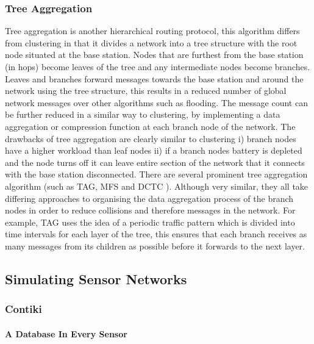 \subsubsection*{Tree Aggregation}
Tree aggregation is another hierarchical routing protocol, this algorithm differs from clustering in that it divides a network into a tree structure with the root node situated at the base station. Nodes that are furthest from the base station (in hops) become leaves of the tree and any intermediate nodes become branches. Leaves and branches forward messages towards the base station and around the network using the tree structure, this results in a reduced number of global network messages over other algorithms such as flooding. The message count can be further reduced in a similar way to clustering, by implementing a data aggregation or compression function at each branch node of the network. The drawbacks of tree aggregation are clearly similar to clustering i) branch nodes have a higher workload than leaf nodes ii) if a branch nodes battery is depleted and the node turns off it can leave entire section of the network that it connects with the base station disconnected. There are several prominent tree aggregation algorithm (such as TAG, MFS and DCTC \cite{1628365}). Although very similar, they all take differing approaches to organising the data aggregation process of the branch nodes in order to reduce collisions and therefore messages in the network. For example, TAG uses the idea of a periodic traffic pattern which is divided into time intervals for each layer of the tree, this ensures that each branch receives as many messages from its children as possible before it forwards to the next layer.   


\cite{aggphdfeng} %
\cite{TankBible} %
\cite{Akkaya2005325} %

\subsection{Simulating Sensor Networks}

\subsubsection*{Contiki}

\paragraph{A Database In Every Sensor} 
\cite{Tsiftes:2011:DS:2070942.2070974} %
\cite{TinyDB}


